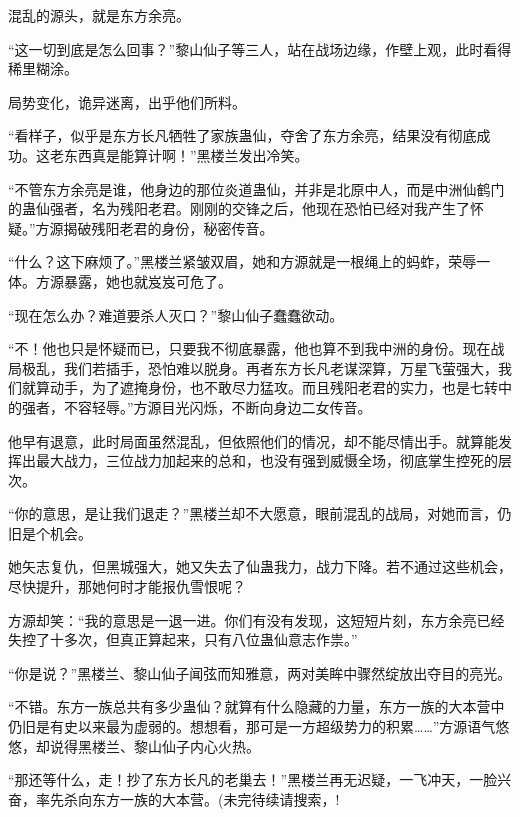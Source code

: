 \begin{this_body}
混乱的源头，就是东方余亮。

“这一切到底是怎么回事？”黎山仙子等三人，站在战场边缘，作壁上观，此时看得稀里糊涂。

局势变化，诡异迷离，出乎他们所料。

“看样子，似乎是东方长凡牺牲了家族蛊仙，夺舍了东方余亮，结果没有彻底成功。这老东西真是能算计啊！”黑楼兰发出冷笑。

“不管东方余亮是谁，他身边的那位炎道蛊仙，并非是北原中人，而是中洲仙鹤门的蛊仙强者，名为残阳老君。刚刚的交锋之后，他现在恐怕已经对我产生了怀疑。”方源揭破残阳老君的身份，秘密传音。

“什么？这下麻烦了。”黑楼兰紧皱双眉，她和方源就是一根绳上的蚂蚱，荣辱一体。方源暴露，她也就岌岌可危了。

“现在怎么办？难道要杀人灭口？”黎山仙子蠢蠢欲动。

“不！他也只是怀疑而已，只要我不彻底暴露，他也算不到我中洲的身份。现在战局极乱，我们若插手，恐怕难以脱身。再者东方长凡老谋深算，万星飞萤强大，我们就算动手，为了遮掩身份，也不敢尽力猛攻。而且残阳老君的实力，也是七转中的强者，不容轻辱。”方源目光闪烁，不断向身边二女传音。

他早有退意，此时局面虽然混乱，但依照他们的情况，却不能尽情出手。就算能发挥出最大战力，三位战力加起来的总和，也没有强到威慑全场，彻底掌生控死的层次。

“你的意思，是让我们退走？”黑楼兰却不大愿意，眼前混乱的战局，对她而言，仍旧是个机会。

她矢志复仇，但黑城强大，她又失去了仙蛊我力，战力下降。若不通过这些机会，尽快提升，那她何时才能报仇雪恨呢？

方源却笑：“我的意思是一退一进。你们有没有发现，这短短片刻，东方余亮已经失控了十多次，但真正算起来，只有八位蛊仙意志作祟。”

“你是说？”黑楼兰、黎山仙子闻弦而知雅意，两对美眸中骤然绽放出夺目的亮光。

“不错。东方一族总共有多少蛊仙？就算有什么隐藏的力量，东方一族的大本营中仍旧是有史以来最为虚弱的。想想看，那可是一方超级势力的积累……”方源语气悠悠，却说得黑楼兰、黎山仙子内心火热。

“那还等什么，走！抄了东方长凡的老巢去！”黑楼兰再无迟疑，一飞冲天，一脸兴奋，率先杀向东方一族的大本营。(未完待续请搜索，!

\end{this_body}

